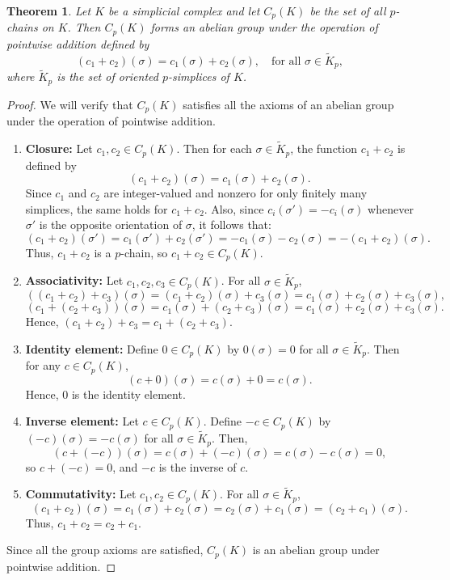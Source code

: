 \documentclass[12pt,oneside,reqno]{amsart}
\theoremstyle{plain}
\newtheorem{theorem}{Theorem}[section]
\theoremstyle{definition}
\theoremstyle{remark}
\newcommand{\0}{{\textbf{0}}}
\begin{document}
\begin{theorem}\label{thm:CpK-is-group}
Let $K$ be a simplicial complex and let $C_p(K)$ be the set of all $p$-chains on $K$. Then $C_p(K)$ forms an abelian group under the operation of pointwise addition defined by
\[
(c_1 + c_2)(\sigma) = c_1(\sigma) + c_2(\sigma), \quad \text{for all } \sigma \in \widetilde{K}_p,
\]
where $\widetilde{K}_p$ is the set of oriented $p$-simplices of $K$.
\end{theorem}

\begin{proof}
We will verify that $C_p(K)$ satisfies all the axioms of an abelian group under the operation of pointwise addition.
\begin{enumerate}
\item  \textbf{Closure:} Let $c_1, c_2 \in C_p(K)$. Then for each $\sigma \in \widetilde{K}_p$, the function $c_1 + c_2$ is defined by
\[
(c_1 + c_2)(\sigma) = c_1(\sigma) + c_2(\sigma).
\]
Since $c_1$ and $c_2$ are integer-valued and nonzero for only finitely many simplices, the same holds for $c_1 + c_2$. Also, since $c_i(\sigma') = -c_i(\sigma)$ whenever $\sigma'$ is the opposite orientation of $\sigma$, it follows that:
\[
(c_1 + c_2)(\sigma') = c_1(\sigma') + c_2(\sigma') = -c_1(\sigma) - c_2(\sigma) = -(c_1 + c_2)(\sigma).
\]
Thus, $c_1 + c_2$ is a $p$-chain, so $c_1 + c_2 \in C_p(K)$.
\item \textbf{Associativity:} Let $c_1, c_2, c_3 \in C_p(K)$. For all $\sigma \in \widetilde{K}_p$,
\[
((c_1 + c_2) + c_3)(\sigma) = (c_1 + c_2)(\sigma) + c_3(\sigma) = c_1(\sigma) + c_2(\sigma) + c_3(\sigma),
\]
\[
(c_1 + (c_2 + c_3))(\sigma) = c_1(\sigma) + (c_2 + c_3)(\sigma) = c_1(\sigma) + c_2(\sigma) + c_3(\sigma).
\]
Hence, $(c_1 + c_2) + c_3 = c_1 + (c_2 + c_3)$.
\item \textbf{Identity element:} Define $0 \in C_p(K)$ by $0(\sigma) = 0$ for all $\sigma \in \widetilde{K}_p$. Then for any $c \in C_p(K)$,
\[
(c + 0)(\sigma) = c(\sigma) + 0 = c(\sigma).
\]
Hence, $0$ is the identity element.
\item  \textbf{Inverse element:} Let $c \in C_p(K)$. Define $-c \in C_p(K)$ by $(-c)(\sigma) = -c(\sigma)$ for all $\sigma \in \widetilde{K}_p$. Then,
\[
(c + (-c))(\sigma) = c(\sigma) + (-c)(\sigma) = c(\sigma) - c(\sigma) = 0,
\]
so $c + (-c) = 0$, and $-c$ is the inverse of $c$.
\item \textbf{Commutativity:} Let $c_1, c_2 \in C_p(K)$. For all $\sigma \in \widetilde{K}_p$,
\[
(c_1 + c_2)(\sigma) = c_1(\sigma) + c_2(\sigma) = c_2(\sigma) + c_1(\sigma) = (c_2 + c_1)(\sigma).
\]
Thus, $c_1 + c_2 = c_2 + c_1$.
\end{enumerate}
Since all the group axioms are satisfied, $C_p(K)$ is an abelian group under pointwise addition.
\end{proof}
\end{document}
